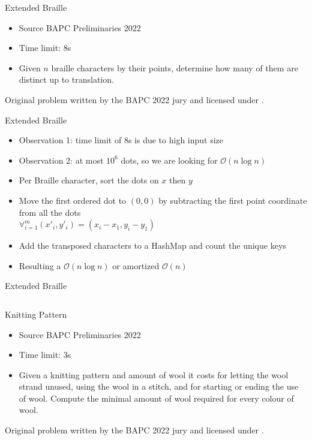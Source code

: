 \documentclass[11pt,pdf, aspectratio=169]{beamer}
\begin{document}
  \begin{frame}{Extended Braille}
    \begin{itemize}
      \item Source BAPC Preliminaries 2022
      \item Time limit: 8s
      \item Given $n$ braille characters by their points, determine how many of them are distinct up to translation.
    \end{itemize}
    Original problem written by the BAPC 2022 jury and licensed under \doclicenseLongNameRef.

    \doclicenseImage

  \end{frame}
  \begin{frame}{Extended Braille}
    \begin{itemize}
      \item Observation 1: time limit of 8s is due to high input size
      \item Observation 2: at most $10^6$ dots, so we are looking for $\mathcal{O}(n\log{}n)$
      \item Per Braille character, sort the dots on $x$ then $y$
      \item Move the first ordered dot to $(0, 0)$ by subtracting the first point coordinate from all the dots\\
      \quad$\forall_{i=1}^m (x'_i, y'_i) = (x_i - x_1, y_i - y_1)$
      \item Add the transposed characters to a HashMap and count the unique keys
      \item Resulting a $\mathcal{O}(n\log{}n)$ or amortized $\mathcal{O}(n)$
    \end{itemize}
  \end{frame}
  \begin{frame}[containsverbatim]{Extended Braille}
    \inputminted{python}{code/session-1/python/dapc-e.py}
  \end{frame}
  \begin{frame}{Knitting Pattern}
    \begin{itemize}
      \item Source BAPC Preliminaries 2022
      \item Time limit: 3s
      \item Given a knitting pattern and amount of wool it costs for letting the wool strand unused, using the wool in a stitch, and for starting or ending the use of wool.
      Compute the minimal amount of wool required for every colour of wool.
    \end{itemize}
    Original problem written by the BAPC 2022 jury and licensed under \doclicenseLongNameRef.

    \doclicenseImage
  \end{frame}
\end{document}
